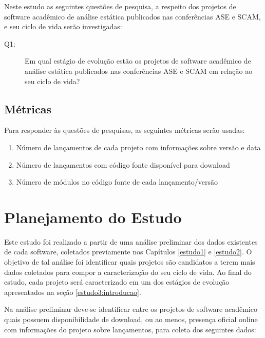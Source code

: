 Neste estudo as seguintes questões de pesquisa, a respeito dos projetos de
software acadêmico de análise estática publicados nas conferências ASE e SCAM,
e seu ciclo de vida serão investigadas:

\newcommand{\EstudoTresQuestaoUm}{
  Em qual estágio de evolução estão os projetos de software acadêmico de
  análise estática publicados nas conferências ASE e SCAM em relação ao seu
  ciclo de vida?
}

\begin{description}
  \item [Q1:] \EstudoTresQuestaoUm
\end{description}

\subsection{Métricas}

Para responder às questões de pesquisas, as seguintes métricas serão usadas:

\begin{enumerate}
  \item Número de lançamentos de cada projeto com informações sobre versão e data
  \item Número de lançamentos com código fonte disponível para download
  \item Número de módulos no código fonte de cada lançamento/versão
\end{enumerate}


\section{Planejamento do Estudo} \label{estudo3:planejamento} %

Este estudo foi realizado a partir de uma análise preliminar dos dados existentes
de cada software, coletados previamente nos Capítulos \ref{estudo1} e
\ref{estudo2}. O objetivo de tal análise foi identificar quais projetos são candidatos a
terem mais dados coletados para compor a caracterização do seu ciclo de vida. 
Ao final do estudo, cada projeto será caracterizado em um dos estágios
de evolução apresentados na seção \ref{estudo3:introducao}.

Na análise preliminar deve-se identificar entre os projetos de software
acadêmico quais possuem disponibilidade de download, ou ao menos, presença
oficial online com informações do projeto sobre lançamentos, para coleta
dos seguintes dados:

